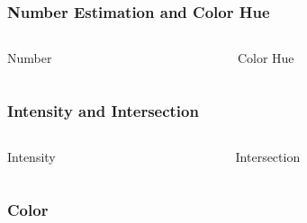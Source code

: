 \documentclass[12pt]{beamer}\usepackage[]{graphicx}\usepackage[]{color}
\begin{document}

\begin{frame}
\frametitle{Number Estimation and Color Hue}

\begin{columns}[t]
\begin{column}{0.5\textwidth}
\begin{center}
Number
\end{center}
\end{column}

\begin{column}{0.5\textwidth}
\begin{center}
Color Hue
\end{center}
\end{column}
\end{columns}

\end{frame}


\begin{frame}
\frametitle{Intensity and Intersection}

\begin{columns}[t]
\begin{column}{0.5\textwidth}
\begin{center}
Intensity
\end{center}
\end{column}

\begin{column}{0.5\textwidth}
\begin{center}
Intersection
\end{center}
\end{column}
\end{columns}

\end{frame}


\begin{frame}
\frametitle{Color}
\begin{center}
\end{center}
\end{frame}
\end{document}
